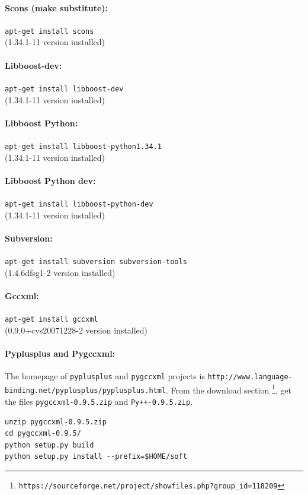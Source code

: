 \documentclass[12pt,a4paper]{article}
\begin{document}
\paragraph{Scons (make substitute):} {\tt apt-get install scons} \\
(1.34.1-11 version installed)


\paragraph{Libboost-dev:} {\tt apt-get install libboost-dev} \\
(1.34.1-11 version installed)


\paragraph{Libboost Python:} {\tt apt-get install libboost-python1.34.1} \\
(1.34.1-11 version installed)


\paragraph{Libboost Python dev:} {\tt apt-get install libboost-python-dev} \\
(1.34.1-11 version installed)

\paragraph{Subversion:} {\tt apt-get install subversion subversion-tools} \\
(1.4.6dfsg1-2 version installed)

\paragraph{Gccxml:} {\tt apt-get install gccxml} \\
(0.9.0+cvs20071228-2 version installed)

\paragraph{Pyplusplus and Pygccxml: }
The homepage of {\tt pyplusplus} and {\tt pygccxml} projects is 
{\tt http://www.language-binding.net/pyplusplus/pyplusplus.html}. From the
download section \footnote{\tt https://sourceforge.net/project/showfiles.php?group\_id=118209}, 
get the files {\tt pygccxml-0.9.5.zip} and {\tt Py++-0.9.5.zip}.

\begin{verbatim}
unzip pygccxml-0.9.5.zip
cd pygccxml-0.9.5/
python setup.py build
python setup.py install --prefix=$HOME/soft
\end{verbatim}
\end{document}
